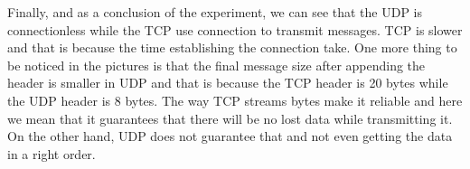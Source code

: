 \documentclass[a4paper,12pt]{article}
\begin{document}
Finally, and as a conclusion of the experiment, we can see that the UDP is connectionless while the TCP use connection to transmit messages. 
TCP is slower and that is because the time establishing the connection take. One more thing to be noticed in the pictures is that the final message size after appending the header is smaller in UDP and that is because the TCP header is 20 bytes while the UDP header is 8 bytes.
The way TCP streams bytes make it reliable and here we mean that it guarantees that there will be no lost data while transmitting it. On the other hand, UDP does not guarantee that and not even getting the data in a right order. 



 
\end{document}
